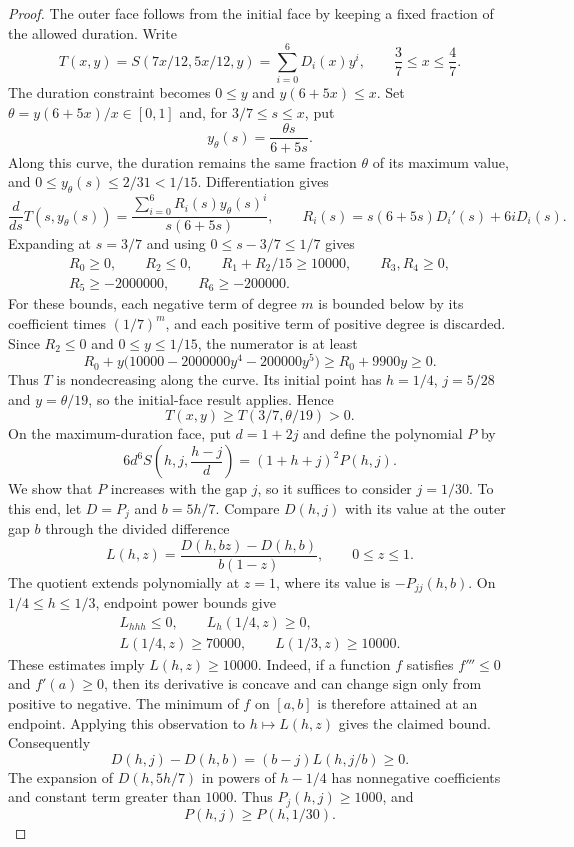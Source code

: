 \begin{proof}
The outer face follows from the initial face by keeping a fixed fraction of the allowed duration.
Write
\[
 T(x,y)=S(7x/12,5x/12,y)=\sum_{i=0}^6D_i(x)y^i,
 \qquad \frac37\le x\le\frac47.
\]
The duration constraint becomes $0\le y$ and $y(6+5x)\le x$.
Set $\theta=y(6+5x)/x\in[0,1]$ and, for $3/7\le s\le x$, put
\[
 y_\theta(s)=\frac{\theta s}{6+5s}.
\]
Along this curve, the duration remains the same fraction $\theta$ of its maximum value, and
$0\le y_\theta(s)\le2/31<1/15$.
Differentiation gives
\[
 \frac{d}{ds}T(s,y_\theta(s))
 =\frac{\sum_{i=0}^6R_i(s)y_\theta(s)^i}{s(6+5s)},
 \qquad R_i(s)=s(6+5s)D_i'(s)+6iD_i(s).
\]
Expanding at $s=3/7$ and using $0\le s-3/7\le1/7$ gives
\begin{gather*}
 R_0\ge0,\qquad R_2\le0,\qquad R_1+R_2/15\ge10000,\qquad R_3,R_4\ge0,\\
 R_5\ge-2000000,\qquad R_6\ge-200000.
\end{gather*}
For these bounds, each negative term of degree $m$ is bounded below by its coefficient times
$(1/7)^m$, and each positive term of positive degree is discarded.
Since $R_2\le0$ and $0\le y\le1/15$, the numerator is at least
\[
 R_0+y\bigl(10000-2000000y^4-200000y^5\bigr)\ge R_0+9900y\ge0.
\]
Thus $T$ is nondecreasing along the curve. Its initial point has
$h=1/4$, $j=5/28$ and $y=\theta/19$, so the initial-face result applies. Hence
\[
 T(x,y)\ge T(3/7,\theta/19)>0.
\]
On the maximum-duration face, put $d=1+2j$ and define the polynomial $P$ by
\[
 6d^6S\left(h,j,\frac{h-j}{d}\right)=(1+h+j)^2P(h,j).
\]
We show that $P$ increases with the gap $j$, so it suffices to consider $j=1/30$.
To this end, let $D=P_j$ and $b=5h/7$. Compare $D(h,j)$ with its value at the outer gap $b$
through the divided difference
\[
 L(h,z)=\frac{D(h,bz)-D(h,b)}{b(1-z)},\qquad 0\le z\le1.
\]
The quotient extends polynomially at $z=1$, where its value is $-P_{jj}(h,b)$.
On $1/4\le h\le1/3$, endpoint power bounds give
\begin{gather*}
 L_{hhh}\le0,\qquad L_h(1/4,z)\ge0,\\
 L(1/4,z)\ge70000,\qquad L(1/3,z)\ge10000.
\end{gather*}
These estimates imply $L(h,z)\ge10000$. Indeed, if a function $f$ satisfies $f'''\le0$ and
$f'(a)\ge0$, then its derivative is concave and can change sign only from positive to negative.
The minimum of $f$ on $[a,b]$ is therefore attained at an endpoint.
Applying this observation to $h\mapsto L(h,z)$ gives the claimed bound. Consequently
\[
 D(h,j)-D(h,b)=(b-j)L(h,j/b)\ge0.
\]
The expansion of $D(h,5h/7)$ in powers of $h-1/4$ has nonnegative coefficients and constant
term greater than $1000$. Thus $P_j(h,j)\ge1000$, and
\[
 P(h,j)\ge P(h,1/30).
\]


\end{proof}
